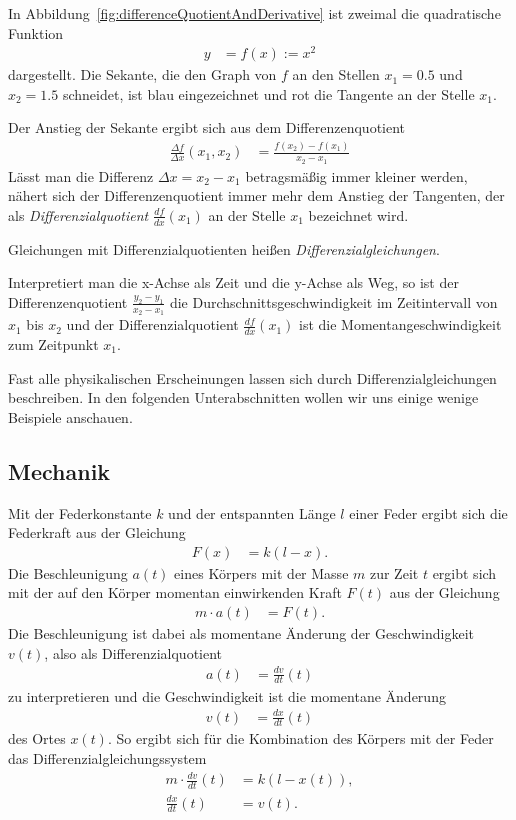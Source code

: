 \documentclass{article}
\def\ddx#1{\frac{d#1}{dx}}
\def\ddt#1{\frac{d#1}{dt}}
\begin{document}
In Abbildung~\ref{fig:differenceQuotientAndDerivative} ist zweimal die quadratische Funktion
\begin{align*}
  y&=f(x) := x^2
\end{align*}
dargestellt.
Die Sekante, die den Graph von $f$ an den Stellen
$x_1=0.5$ und $x_2=1.5$ schneidet, ist blau eingezeichnet und rot die
Tangente an der Stelle $x_1$.

Der Anstieg der Sekante ergibt sich aus dem Differenzenquotient
\begin{align*}
  \frac{\Delta f}{\Delta x}(x_1,x_2) &= \frac{f(x_2)-f(x_1)}{x_2-x_1}
\end{align*}
Lässt man die Differenz $\Delta x=x_2-x_1$ betragsmäßig immer kleiner
werden, nähert sich der Differenzenquotient immer mehr dem Anstieg der
Tangenten, der als \emph{Differenzialquotient} $\ddx{f}(x_1)$ an der
Stelle $x_1$ bezeichnet wird.

Gleichungen mit Differenzialquotienten heißen \emph{Differenzialgleichungen}.

Interpretiert man die x-Achse als Zeit und die y-Achse als Weg, so ist
der Differenzenquotient $\frac{y_2-y_1}{x_2-x_1}$ die
Durchschnittsgeschwindigkeit im Zeitintervall von $x_1$ bis $x_2$ und
der Differenzialquotient $\ddx f(x_1)$ ist die Momentangeschwindigkeit
zum Zeitpunkt $x_1$.

Fast alle physikalischen Erscheinungen lassen sich durch Differenzialgleichungen beschreiben. In den folgenden Unterabschnitten wollen wir uns einige wenige Beispiele anschauen.
\subsection{Mechanik}
Mit der Federkonstante $k$ und der entspannten Länge $l$ einer Feder ergibt sich die Federkraft aus der Gleichung
\begin{align*}
  F(x) &= k(l-x).
\end{align*}
Die Beschleunigung $a(t)$ eines Körpers mit der Masse $m$ zur Zeit $t$ ergibt sich mit der auf den Körper momentan einwirkenden Kraft $F(t)$ aus der Gleichung
\begin{align*}
  m\cdot a(t) &=F(t).
\end{align*}
Die Beschleunigung ist dabei als momentane Änderung der Geschwindigkeit $v(t)$, also als Differenzialquotient
\begin{align*}
  a(t) &= \ddt{v}(t)
\end{align*}
zu interpretieren und die Geschwindigkeit ist die momentane Änderung
\begin{align*}
  v(t) &= \ddt{x}(t)
\end{align*}
des Ortes $x(t)$. So ergibt sich für die Kombination des Körpers mit der Feder das Differenzialgleichungssystem
\begin{align*}
  m\cdot \ddt v(t) &= k(l-x(t)),\\
  \ddt x(t) &= v(t).
\end{align*}
\end{document}
